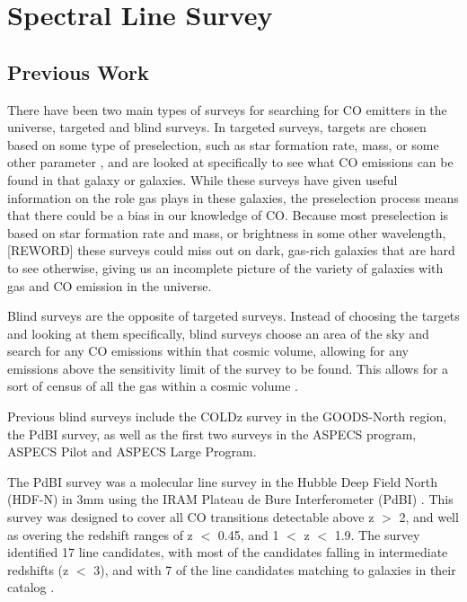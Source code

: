\chapter{Spectral Line Survey}

\section{Previous Work}

There have been two main types of surveys for searching for CO emitters in the universe, targeted and blind surveys. In targeted surveys, targets are chosen based on some type of preselection, such as star formation rate, mass, or some other parameter \cite{walter2016alma, decarli2019alma}, and are looked at specifically to see what CO emissions can be found in that galaxy or galaxies. While these surveys have given useful information on the role gas plays in these galaxies, the preselection process means that there could be a bias in our knowledge of CO. Because most preselection is based on star formation rate and mass, or brightness in some other wavelength,[REWORD] these surveys could miss out on dark, gas-rich galaxies that are hard to see otherwise, giving us an incomplete picture of the variety of galaxies with gas and CO emission in the universe. 

Blind surveys are the opposite of targeted surveys. Instead of choosing the targets and looking at them specifically, blind surveys choose an area of the sky and search for any CO emissions within that cosmic volume, allowing for any emissions above the sensitivity limit of the survey to be found. This allows for a sort of census of all the gas within a cosmic volume \cite{decarli2019alma}. 

Previous blind surveys include the COLDz survey in the GOODS-North region, the PdBI survey, as well as the first two surveys in the ASPECS program, ASPECS Pilot and ASPECS Large Program. 

The PdBI survey was a molecular line survey in the Hubble Deep Field North (HDF-N) in 3mm using the IRAM Plateau de Bure Interferometer (PdBI) \cite{decarli2014molecular}. This survey was designed to cover all CO transitions detectable above z $>$ 2, and well as overing the redshift ranges of z $<$ 0.45, and 1 $<$ z $<$ 1.9. The survey identified 17 line candidates, with most of the candidates falling in intermediate redshifts (z $<$ 3), and with 7 of the line candidates matching to galaxies in their catalog \cite{decarli2014molecular}. 

